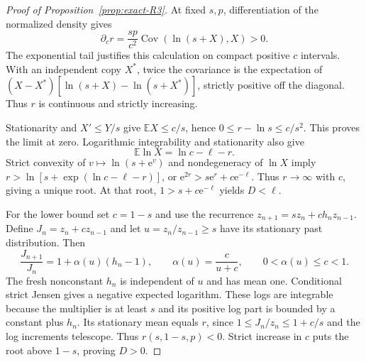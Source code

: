 \begin{proof}[Proof of Proposition~\ref{prop:exact-R3}]
At fixed $s,p$, differentiation of the normalized density gives
\begin{equation}
 \partial_c r=\frac{sp}{c^2}\operatorname{Cov}(\ln(s+X),X)>0.
 \label{eq:exact-rate-derivative}
\end{equation}
The exponential tail justifies this calculation on compact positive $c$ intervals. With an independent copy $X^*$, twice the covariance is the expectation of $(X-X^*)[\ln(s+X)-\ln(s+X^*)]$, strictly positive off the diagonal. Thus $r$ is continuous and strictly increasing.

Stationarity and $X'\leq Y/s$ give $\mathbb EX\leq c/s$, hence $0\leq r-\ln s\leq c/s^2$. This proves the limit at zero. Logarithmic integrability and stationarity also give
\begin{equation}
 \mathbb E\ln X=\ln c-\ell-r.
 \label{eq:exact-log-stationarity}
\end{equation}
Strict convexity of $v\mapsto\ln(s+\mathrm{e}^v)$ and nondegeneracy of $\ln X$ imply $r>\ln[s+\exp(\ln c-\ell-r)]$, or $\mathrm{e}^{2r}>s\mathrm{e}^r+c\mathrm{e}^{-\ell}$. Thus $r\to\infty$ with $c$, giving a unique root. At that root, $1>s+c\mathrm{e}^{-\ell}$ yields $D<\ell$.

For the lower bound set $c=1-s$ and use the recurrence $z_{n+1}=sz_n+ch_nz_{n-1}$. Define $J_n=z_n+cz_{n-1}$ and let $u=z_n/z_{n-1}\geq s$ have its stationary past distribution. Then
\begin{equation}
 \frac{J_{n+1}}{J_n}=1+\alpha(u)(h_n-1),\qquad
 \alpha(u)=\frac{c}{u+c},\qquad 0<\alpha(u)\leq c<1.
 \label{eq:exact-strict-jensen}
\end{equation}
The fresh nonconstant $h_n$ is independent of $u$ and has mean one. Conditional strict Jensen gives a negative expected logarithm. These logs are integrable because the multiplier is at least $s$ and its positive log part is bounded by a constant plus $h_n$. Its stationary mean equals $r$, since $1\leq J_n/z_n\leq1+c/s$ and the log increments telescope. Thus $r(s,1-s,p)<0$. Strict increase in $c$ puts the root above $1-s$, proving $D>0$.
\end{proof}

